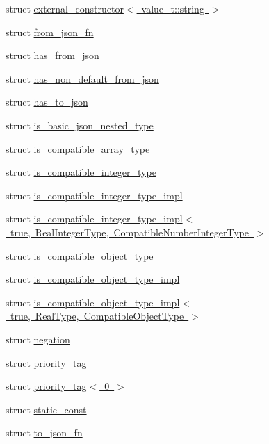 \begin{DoxyCompactItemize}
\item 
struct \mbox{\hyperlink{structnlohmann_1_1detail_1_1external__constructor_3_01value__t_1_1string_01_4}{external\+\_\+constructor$<$ value\+\_\+t\+::string $>$}}
\item 
struct \mbox{\hyperlink{structnlohmann_1_1detail_1_1from__json__fn}{from\+\_\+json\+\_\+fn}}
\item 
struct \mbox{\hyperlink{structnlohmann_1_1detail_1_1has__from__json}{has\+\_\+from\+\_\+json}}
\item 
struct \mbox{\hyperlink{structnlohmann_1_1detail_1_1has__non__default__from__json}{has\+\_\+non\+\_\+default\+\_\+from\+\_\+json}}
\item 
struct \mbox{\hyperlink{structnlohmann_1_1detail_1_1has__to__json}{has\+\_\+to\+\_\+json}}
\item 
struct \mbox{\hyperlink{structnlohmann_1_1detail_1_1is__basic__json__nested__type}{is\+\_\+basic\+\_\+json\+\_\+nested\+\_\+type}}
\item 
struct \mbox{\hyperlink{structnlohmann_1_1detail_1_1is__compatible__array__type}{is\+\_\+compatible\+\_\+array\+\_\+type}}
\item 
struct \mbox{\hyperlink{structnlohmann_1_1detail_1_1is__compatible__integer__type}{is\+\_\+compatible\+\_\+integer\+\_\+type}}
\item 
struct \mbox{\hyperlink{structnlohmann_1_1detail_1_1is__compatible__integer__type__impl}{is\+\_\+compatible\+\_\+integer\+\_\+type\+\_\+impl}}
\item 
struct \mbox{\hyperlink{structnlohmann_1_1detail_1_1is__compatible__integer__type__impl_3_01true_00_01_real_integer_type78b0ba77f36a8c8169cdb79b01d1a4bf}{is\+\_\+compatible\+\_\+integer\+\_\+type\+\_\+impl$<$ true, Real\+Integer\+Type, Compatible\+Number\+Integer\+Type $>$}}
\item 
struct \mbox{\hyperlink{structnlohmann_1_1detail_1_1is__compatible__object__type}{is\+\_\+compatible\+\_\+object\+\_\+type}}
\item 
struct \mbox{\hyperlink{structnlohmann_1_1detail_1_1is__compatible__object__type__impl}{is\+\_\+compatible\+\_\+object\+\_\+type\+\_\+impl}}
\item 
struct \mbox{\hyperlink{structnlohmann_1_1detail_1_1is__compatible__object__type__impl_3_01true_00_01_real_type_00_01_compatible_object_type_01_4}{is\+\_\+compatible\+\_\+object\+\_\+type\+\_\+impl$<$ true, Real\+Type, Compatible\+Object\+Type $>$}}
\item 
struct \mbox{\hyperlink{structnlohmann_1_1detail_1_1negation}{negation}}
\item 
struct \mbox{\hyperlink{structnlohmann_1_1detail_1_1priority__tag}{priority\+\_\+tag}}
\item 
struct \mbox{\hyperlink{structnlohmann_1_1detail_1_1priority__tag_3_010_01_4}{priority\+\_\+tag$<$ 0 $>$}}
\item 
struct \mbox{\hyperlink{structnlohmann_1_1detail_1_1static__const}{static\+\_\+const}}
\item 
struct \mbox{\hyperlink{structnlohmann_1_1detail_1_1to__json__fn}{to\+\_\+json\+\_\+fn}}
\end{DoxyCompactItemize}
